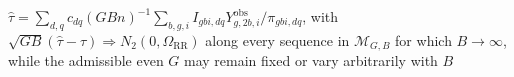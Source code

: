 \(\widehat\tau=\sum_{d,q}c_{dq}(GBn)^{-1}\sum_{b,g,i}I_{gbi,dq}Y^{\mathrm{obs}}_{g,2b,i}/\pi_{gbi,dq}\), with \(\sqrt{GB}(\widehat\tau-\tau)\Rightarrow N_2(0,\Omega_{\mathrm{RR}})\) along every sequence in \(\mathcal M_{G,B}\) for which \(B\to\infty\), while the admissible even \(G\) may remain fixed or vary arbitrarily with \(B\)